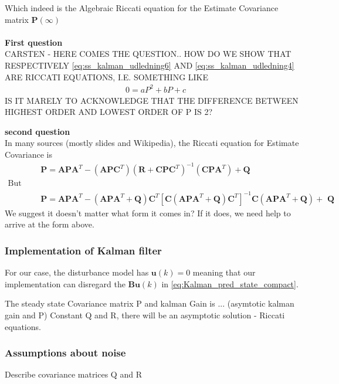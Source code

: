 Which indeed is the Algebraic Riccati equation for the Estimate Covariance matrix $\textbf{P}(\infty)$\\
\\

\textbf{First question}\\

CARSTEN - HERE COMES THE QUESTION.. HOW DO WE SHOW THAT RESPECTIVELY \cref{eq:ss_kalman_udledning6} AND \cref{eq:ss_kalman_udledning4} ARE RICCATI EQUATIONS, I.E. SOMETHING LIKE
\begin{align}
	&0 = aP^2 + bP + c 
\end{align}
IS IT MARELY TO ACKNOWLEDGE THAT THE DIFFERENCE BETWEEN HIGHEST ORDER AND LOWEST ORDER OF P IS 2?

\textbf{second question}\\
In many sources (mostly slides and Wikipedia), the Riccati equation for Estimate Covariance is 
\begin{align}
	&\textbf{P} = \textbf{APA}^T - (\textbf{APC}^T)(\textbf{R}+\textbf{CPC}^T)^{-1}(\textbf{CPA}^T)+\textbf{Q}  \\
	\text{But the closest we can get is } \\
	&\textbf{P} = \textbf{APA}^T - (\textbf{APA}^T+ \textbf{Q})\textbf{C}^T[\textbf{C}(\textbf{APA}^T+\textbf{Q})\textbf{C}^T]^{-1}\textbf{C}(\textbf{APA}^T + \textbf{Q}) + \textbf{ Q}
\end{align}
We suggest it doesn't matter what form it comes in? If it does, we need help to arrive at the form above.




\subsubsection{Implementation of Kalman filter} \label{sec:kalman_imp}
For our case, the disturbance model has $ \textbf{u}(k)=0 $ meaning that our implementation can disregard the $ \textbf{B}\textbf{u}(k) $ in \cref{eq:Kalman_pred_state_compact}.


The steady state Covariance matrix P and kalman Gain is ... (asymtotic kalman gain and P)
Constant Q and R, there will be an asymptotic solution - Riccati equations. 

\subsubsection{Assumptions about noise}
Describe covariance matrices Q and R\\





